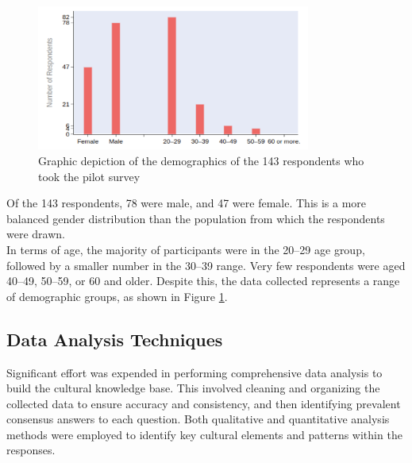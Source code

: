 \documentclass{CSSRforAfrica}
\begin{document}
\begin{figure}[t]
\begin{center}
\includegraphics[width=90mm,angle=0]{images/demographics.png}
\end{center}
\vspace{-5mm}
\caption{Graphic depiction of the demographics of the 143 respondents who took the pilot survey}
\label{fig:demographics}       
\end{figure}

Of the 143 respondents, 78 were male, and 47 were female. This is a more balanced gender distribution than the population from which the respondents were drawn. \\

\noindent In terms of age, the majority of participants were in the 20–29 age group, followed by a smaller number in the 30–39 range. Very few respondents were aged 40–49, 50–59, or 60 and older. Despite this, the data collected represents a range of demographic groups, as shown in Figure \ref{fig:demographics}.

\subsection{Data Analysis Techniques}
\label{section:data_analysis}

Significant effort was expended in performing  comprehensive data analysis to build the cultural knowledge base. This involved cleaning and organizing the collected data to ensure accuracy and consistency, and then identifying prevalent consensus answers to each question. Both qualitative and quantitative analysis methods were employed to identify key cultural elements and patterns within the responses. 
\end{document}
